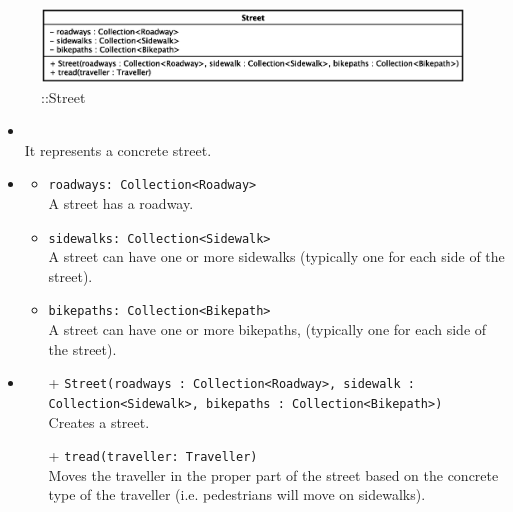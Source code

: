 \begin{figure}[h]
\centering
\includegraphics[scale=0.6,keepaspectratio]{images/solution/app/backend/street.eps}
\caption{\pReactiveComponent::Street}
\label{fig:sd-app-street}
\end{figure}
\FloatBarrier
\begin{itemize}
  \item \textbf{\descr} \\
    It represents a concrete street.
  \item \textbf{\attrs}
  \begin{itemize}
    \item \texttt{roadways: Collection<Roadway>} \\
A street has a roadway.
    \item \texttt{sidewalks: Collection<Sidewalk>} \\
A street can have one or more sidewalks (typically one for each side
of the street).
    \item \texttt{bikepaths: Collection<Bikepath>} \\
A street can have one or more bikepaths, (typically one for each side
of the street).
  \end{itemize}
  \item \textbf{\ops}
  \begin{itemize}
  \item[+] \texttt{Street(roadways : Collection<Roadway>, sidewalk : Collection<Sidewalk>, bikepaths : Collection<Bikepath>)} \\
    Creates a street.
    \item[+] \texttt{tread(traveller: Traveller)} \\
Moves the traveller in the proper part of the street based on the
concrete type of the traveller (i.e. pedestrians will move on sidewalks).
  \end{itemize}
\end{itemize}
